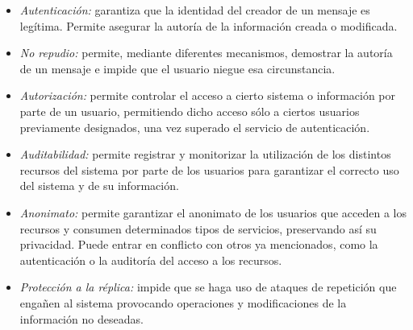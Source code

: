 \begin{itemize}
	\item \emph{Autenticación:} garantiza que la identidad del creador de un mensaje es legítima. Permite asegurar la autoría de la información creada o modificada.
	\item \emph{No repudio:} permite, mediante diferentes mecanismos, demostrar la autoría de un mensaje e impide que el usuario niegue esa circunstancia.
	\item \emph{Autorización:} permite controlar el acceso a cierto sistema o información por parte de un usuario, permitiendo dicho acceso sólo a ciertos usuarios previamente designados, una vez superado el servicio de autenticación. 
	\item \emph{Auditabilidad:} permite registrar y monitorizar la utilización de los distintos recursos del sistema por parte de los usuarios para garantizar el correcto uso del sistema y de su información.
	\item \emph{Anonimato:} permite garantizar el anonimato de los usuarios que acceden a los recursos y consumen determinados tipos de servicios, preservando así su privacidad. Puede entrar en conflicto con otros ya mencionados, como la autenticación o la auditoría del acceso a los recursos.
	\item \emph{Protección a la réplica:} impide que se haga uso de ataques de repetición que engañen al sistema provocando operaciones y modificaciones de la información no deseadas.
\end{itemize}

